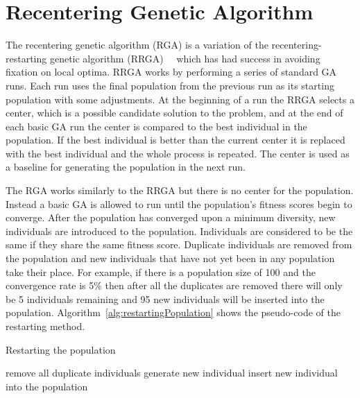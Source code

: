 \section{Recentering Genetic Algorithm}
\label{sec:rga}

The recentering genetic algorithm (RGA) is a variation of the recentering-restarting genetic algorithm (RRGA)~\cite{hughes2013recentering}~\cite{hughes2013edit} which has had success in avoiding fixation on local optima. RRGA works by performing a series of standard GA runs. Each run uses the final population from the previous run as its starting population with some adjustments. At the beginning of a run the RRGA selects a center, which is a possible candidate solution to the problem, and at the end of each basic GA run the center is compared to the best individual in the population. If the best individual is better than the current center it is replaced with the best individual and the whole process is repeated. The center is used as a baseline for generating the population in the next run.

The RGA works similarly to the RRGA but there is no center for the population. Instead a basic GA is allowed to run until the population's fitness scores begin to converge. After the population has converged upon a minimum diversity, new individuals are introduced to the population. Individuals are considered to be the same if they share the same fitness score. Duplicate individuals are removed from the population and new individuals that have not yet been in any population take their place. For example, if there is a population size of 100 and the convergence rate is 5\% then after all the duplicates are removed there will only be 5 individuals remaining and 95 new individuals will be inserted into the population. Algorithm~\ref{alg:restartingPopulation} shows the pseudo-code of the restarting method.

\begin{algorithm}[H]
\caption{Restarting the population}
\label{alg:restartingPopulation}
\begin{algorithmic}

  \STATE remove all duplicate individuals
  	\STATE generate new individual
  	\STATE insert new individual into the population
  \ENDWHILE
\ENDIF

\end{algorithmic}
\end{algorithm}